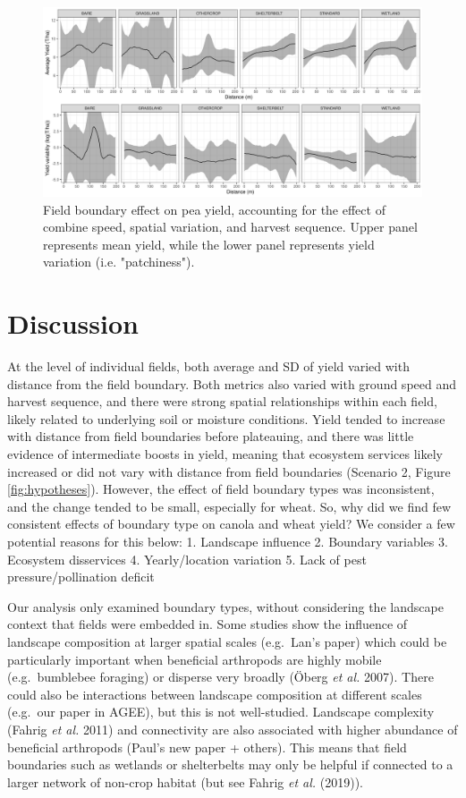 \documentclass[]{elsarticle} %
\begin{document}
\begin{figure}
\includegraphics[width=1\linewidth]{../Figures/ModelSummary3a_peas} \caption{Field boundary effect on pea yield, accounting for the effect of combine speed, spatial variation, and harvest sequence. Upper panel represents mean yield, while the lower panel represents yield variation (i.e. "patchiness").}\label{fig:peaPlot}
\end{figure}

\hypertarget{discussion}{%
\section{Discussion}\label{discussion}}

At the level of individual fields, both average and SD of yield varied with distance from the field boundary.
Both metrics also varied with ground speed and harvest sequence, and there were strong spatial relationships within each field, likely related to underlying soil or moisture conditions.
Yield tended to increase with distance from field boundaries before plateauing, and there was little evidence of intermediate boosts in yield, meaning that ecosystem services likely increased or did not vary with distance from field boundaries (Scenario 2, Figure \ref{fig:hypotheses}).
However, the effect of field boundary types was inconsistent, and the change tended to be small, especially for wheat.
So, why did we find few consistent effects of boundary type on canola and wheat yield?
We consider a few potential reasons for this below:
1. Landscape influence
2. Boundary variables
3. Ecosystem disservices
4. Yearly/location variation
5. Lack of pest pressure/pollination deficit

Our analysis only examined boundary types, without considering the landscape context that fields were embedded in.
Some studies show the influence of landscape composition at larger spatial scales (e.g.~Lan's paper) which could be particularly important when beneficial arthropods are highly mobile (e.g.~bumblebee foraging) or disperse very broadly (Öberg \emph{et al.} 2007).
There could also be interactions between landscape composition at different scales (e.g.~our paper in AGEE), but this is not well-studied.
Landscape complexity (Fahrig \emph{et al.} 2011) and connectivity are also associated with higher abundance of beneficial arthropods (Paul's new paper + others).
This means that field boundaries such as wetlands or shelterbelts may only be helpful if connected to a larger network of non-crop habitat (but see Fahrig \emph{et al.} (2019)).
\end{document}
